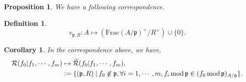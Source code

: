 \documentclass[8pt]{article}
\numberwithin{equation}{section}
\newtheorem{proposition}{Proposition}[section]
\newtheorem{definition}{Definition}[section]
\newtheorem{corollary}{Corollary} [section]
\DeclareMathOperator{\tmod}{mod}
\newcommand{\defeq}{\vcentcolon=}
\newcommand{\cR}[0]{\mathcal{R}}
\newcommand{\sep}[0]{\:|\:}
\newcommand{\p}[0]{\mathfrak{p}}
\begin{document}
\begin{proposition}
  We have a following correspondence.
  \begin{center}
  \end{center}
\end{proposition}

\begin{definition}
  \begin{equation*}
    v_{\p,R}:A\mapsto (\mathrm{Frac}(A/\p)^\times/R^\times)\cup\{0\}.
  \end{equation*}
\end{definition}

\begin{corollary}
  In the correspondence above, we have,
  \begin{align*}
    \cR(f_0|f_1,\cdots,f_m)& \mapsto \widetilde{\cR}(f_0|f_1,\cdots,f_m),\\
    &\defeq\{(\p,R)\sep f_0\not\in\p, \forall i=1,\cdots,m, f_i\tmod\p\in (f_0\tmod\p)_{A/\p}\}.
  \end{align*}
\end{corollary}
\end{document}
